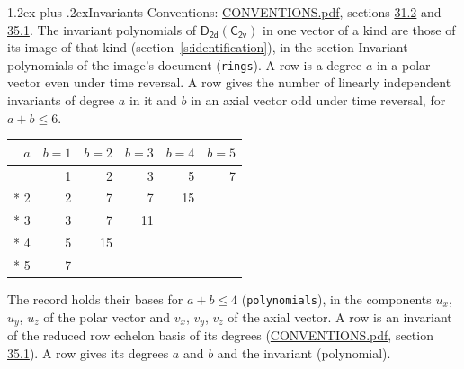 \documentclass[10pt,a4paper]{article}
\makeatletter
\renewcommand\section{\@startsection{section}{1}{\z@}{-3ex plus -1ex minus -.2ex}%
  {1.2ex plus .2ex}{\normalfont\large\sffamily\bfseries\color{parttitle}}}
\numberwithin{equation}{section}
\newcommand{\grp}[1]{\mathsf{#1}}
\makeatother
\begin{document}
\section{Invariants}\label{s:invariants}
Conventions: \href{../../CONVENTIONS.pdf}{CONVENTIONS.pdf}, sections \href{../../CONVENTIONS.pdf\#conv.31.2}{31.2} and \href{../../CONVENTIONS.pdf\#conv.35.1}{35.1}.
The invariant polynomials of $\grp{D_{2d}}(\grp{C_{2v}})$ in one vector of a kind are those of its image of that kind (section~\ref{s:identification}), in the section Invariant polynomials of the image's document (\texttt{rings}).
\leavevmode\label{n:index.degree.polar}\label{n:index.degree.axial}A row is a degree $a$ in a polar vector even under time reversal. A row gives the number of linearly independent invariants of degree $a$ in it and $b$ in an axial vector odd under time reversal, for $a + b \le 6$.
{\small\begin{longtable}{@{}rrrrrr@{}}\toprule
$a$ & $b = 1$ & $b = 2$ & $b = 3$ & $b = 4$ & $b = 5$\\\midrule\endhead
\bottomrule\endfoot\endlastfoot
1 & 1 & 2 & 3 & 5 & 7\\*
2 & 2 & 7 & 7 & 15 & \\*
3 & 3 & 7 & 11 &  & \\*
4 & 5 & 15 &  &  & \\*
5 & 7 &  &  &  & \\
\bottomrule\end{longtable}}
\leavevmode\label{n:local.component.polar}\label{n:local.component.axial}The record holds their bases for $a + b \le 4$ (\texttt{polynomials}), in the components $u_{x}$, $u_{y}$, $u_{z}$ of the polar vector and $v_{x}$, $v_{y}$, $v_{z}$ of the axial vector. \label{n:head.polynomial}A row is an invariant of the reduced row echelon basis of its degrees (\href{../../CONVENTIONS.pdf}{CONVENTIONS.pdf}, section \href{../../CONVENTIONS.pdf\#conv.35.1}{35.1}). A row gives its degrees $a$ and $b$ and the invariant (polynomial).
\end{document}
